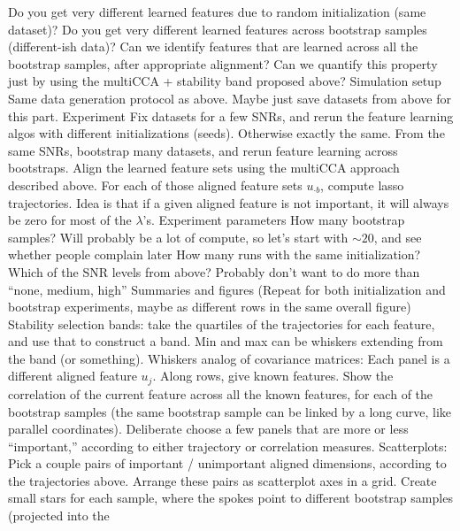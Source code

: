 \documentclass[11pt]{article}
\begin{document}
\begin{outline}
      \3 Do you get very different learned features due to random initialization
      (same dataset)? Do you get very different learned features across
      bootstrap samples (different-ish data)?
      \3 Can we identify features that are learned across all the bootstrap
      samples, after appropriate alignment? Can we quantify this property just
      by using the multiCCA + stability band proposed above?
    \2 Simulation setup
      \3 Same data generation protocol as above. Maybe just save datasets from
      above for this part.
      \3 Experiment
        \4 Fix datasets for a few SNRs, and rerun the feature learning algos
        with different initializations (seeds). Otherwise exactly the same.
        \4 From the same SNRs, bootstrap many datasets, and rerun feature
        learning across bootstraps.
        \4 Align the learned feature sets using the multiCCA approach described
        above. For each of those aligned feature sets $u_{\cdot b}$, compute
        lasso trajectories. Idea is that if a given aligned feature is not
        important, it will always be zero for most of the $\lambda$'s.
      \3 Experiment parameters
        \4 How many bootstrap samples? Will probably be a lot of compute, so
        let's start with $\sim 20$, and see whether people complain later
        \4 How many runs with the same initialization?
        \4 Which of the SNR levels from above? Probably don't want to do more
        than ``none, medium, high''
      \3 Summaries and figures
        \4 (Repeat for both initialization and bootstrap experiments, maybe as
        different rows in the same overall figure)
        \4 Stability selection bands: take the quartiles of the trajectories for
        each feature, and use that to construct a band. Min and max can be
        whiskers extending from the band (or something).
        \4 Whiskers analog of covariance matrices: Each panel is a different
        aligned feature $u_{j}$. Along rows, give known features. Show the
        correlation of the current feature across all the known features, for
        each of the bootstrap samples (the same bootstrap sample can be linked
        by a long curve, like parallel coordinates). Deliberate choose a few
        panels that are more or less ``important,'' according to either
        trajectory or correlation measures.
        \4 Scatterplots: Pick a couple pairs of important / unimportant aligned
        dimensions, according to the trajectories above. Arrange these pairs as
        scatterplot axes in a grid. Create small stars for each sample, where
        the spokes point to different bootstrap samples (projected into the

\end{outline}
\end{document}

